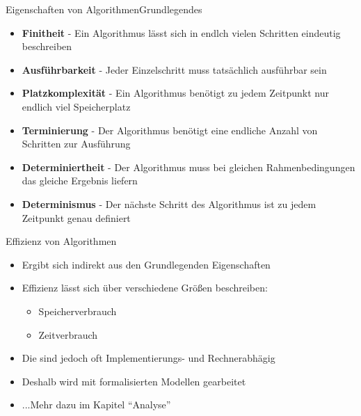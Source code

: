 
\begin{frame}{Eigenschaften von Algorithmen}{Grundlegendes}
    \begin{itemize}[<+->]
        \item \textbf{Finitheit} - Ein Algorithmus lässt sich in endlch vielen Schritten eindeutig beschreiben
        \item \textbf{Ausführbarkeit} - Jeder Einzelschritt muss tatsächlich ausführbar sein
        \item \textbf{Platzkomplexität} - Ein Algorithmus benötigt zu jedem Zeitpunkt nur endlich viel Speicherplatz
        \item \textbf{Terminierung} - Der Algorithmus benötigt eine endliche Anzahl von Schritten zur Ausführung
        \item \textbf{Determiniertheit} - Der Algorithmus muss bei gleichen Rahmenbedingungen das gleiche Ergebnis liefern
        \item \textbf{Determinismus} - Der nächste Schritt des Algorithmus ist zu jedem Zeitpunkt genau definiert
    \end{itemize}
\end{frame}

\begin{frame}{Effizienz von Algorithmen}{}
    \begin{itemize}
        \item Ergibt sich indirekt aus den Grundlegenden Eigenschaften
        \item Effizienz lässt sich über verschiedene Größen beschreiben:
        \begin{itemize}
            \item Speicherverbrauch
            \item Zeitverbrauch
        \end{itemize}
        \item Die sind jedoch oft Implementierungs- und Rechnerabhägig
        \item Deshalb wird mit formalisierten Modellen gearbeitet
        \item ...Mehr dazu im Kapitel "`Analyse"'
    \end{itemize}
\end{frame}


